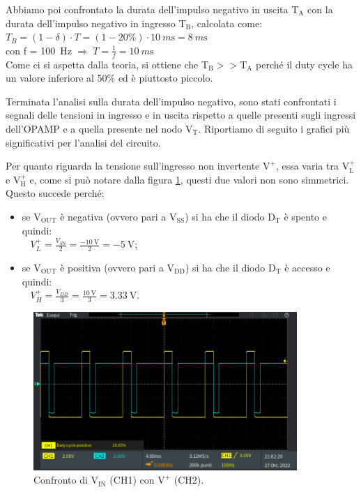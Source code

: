 \documentclass{report}
\begin{document}
Abbiamo poi confrontato la durata dell'impulso negativo in uscita $\mathrm{T_A}$ con la durata dell'impulso negativo in ingresso $\mathrm{T_B}$, calcolata come:
\\[4pt]\indent$\displaystyle{T_B=(1-\delta)\cdot T=(1-20\%)\cdot\SI{10}{m\second}=\SI{8}{m\second}}$
\\[4pt]\indent con f = \SI{100}{\hertz} $\Rightarrow\;\displaystyle{T=\frac{1}{f}=\SI{10}{m\second}}$
\\[4pt]Come ci si aspetta dalla teoria, si ottiene che $\mathrm{T_B}>>\mathrm{T_A}$ perché il duty cycle ha un valore inferiore al 50\% ed è piuttosto piccolo.\par
Terminata l'analisi sulla durata dell'impulso negativo, sono stati confrontati i segnali delle tensioni in ingresso e in uscita rispetto a quelle presenti sugli ingressi dell'OPAMP e a quella presente nel nodo $\mathrm{V_T}$. Riportiamo di seguito i grafici più significativi per l'analisi del circuito.\par
Per quanto riguarda la tensione sull'ingresso non invertente $\mathrm{V^+}$, essa varia tra $\mathrm{V_L^+}$ e $\mathrm{V_H^+}$ e, come si può notare dalla figura \ref{figura:TEK00003}, questi due valori non sono simmetrici. Questo succede perché:
\begin{itemize}
	\item se $\mathrm{V_{OUT}}$ è negativa (ovvero pari a $\mathrm{V_{SS}}$) si ha che il diodo $\mathrm{D_T}$ è spento e quindi:
	\\[4pt]$\displaystyle{\;\;\;V_L^+=\frac{V_{SS}}{2}=\frac{\SI{-10}{\volt}}{2}=\SI{-5}{\volt}}$;
	\item se $\mathrm{V_{OUT}}$ è positiva (ovvero pari a $\mathrm{V_{DD}}$) si ha che il diodo $\mathrm{D_T}$ è accesso e quindi:
	\\[4pt]$\displaystyle{\;\;\;V_H^+=\frac{V_{DD}}{3}=\frac{\SI{10}{\volt}}{3}=\SI{3.33}{\volt}}$.
\end{itemize}
\begin{figure}[h!]
	\centering
	\includegraphics[height=6cm]{immagini/TEK00003}
	\caption{Confronto di $\mathrm{V_{IN}}$ (CH1) con $\mathrm{V^+}$ (CH2).}
	\label{figura:TEK00003}
\end{figure}
\end{document}
